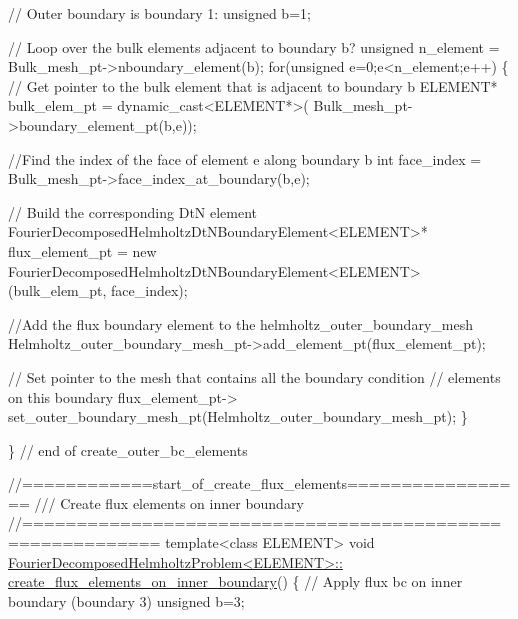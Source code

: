 \begin{DoxyCodeInclude}
{{{{ \textcolor{comment}{// Outer boundary is boundary 1:}
 \textcolor{keywordtype}{unsigned} b=1;

 \textcolor{comment}{// Loop over the bulk elements adjacent to boundary b?}
 \textcolor{keywordtype}{unsigned} n\_element = Bulk\_mesh\_pt->nboundary\_element(b);
 \textcolor{keywordflow}{for}(\textcolor{keywordtype}{unsigned} e=0;e<n\_element;e++)
  \{
   \textcolor{comment}{// Get pointer to the bulk element that is adjacent to boundary b}
   ELEMENT* bulk\_elem\_pt = \textcolor{keyword}{dynamic\_cast<}ELEMENT*\textcolor{keyword}{>}(
    Bulk\_mesh\_pt->boundary\_element\_pt(b,e));
   
   \textcolor{comment}{//Find the index of the face of element e along boundary b }
   \textcolor{keywordtype}{int} face\_index = Bulk\_mesh\_pt->face\_index\_at\_boundary(b,e);
   
   \textcolor{comment}{// Build the corresponding DtN element}
   FourierDecomposedHelmholtzDtNBoundaryElement<ELEMENT>* flux\_element\_pt = \textcolor{keyword}{new} 
    FourierDecomposedHelmholtzDtNBoundaryElement<ELEMENT>(bulk\_elem\_pt,
                                                          face\_index);
   
   \textcolor{comment}{//Add the flux boundary element to the  helmholtz\_outer\_boundary\_mesh}
   Helmholtz\_outer\_boundary\_mesh\_pt->add\_element\_pt(flux\_element\_pt);

   \textcolor{comment}{// Set pointer to the mesh that contains all the boundary condition}
   \textcolor{comment}{// elements on this boundary}
   flux\_element\_pt->
    set\_outer\_boundary\_mesh\_pt(Helmholtz\_outer\_boundary\_mesh\_pt);
  \}

\} \textcolor{comment}{// end of create\_outer\_bc\_elements}



\textcolor{comment}{//============start\_of\_create\_flux\_elements=================}\textcolor{comment}{}
\textcolor{comment}{/// Create flux elements on inner boundary}
\textcolor{comment}{}\textcolor{comment}{//==========================================================}
\textcolor{keyword}{template}<\textcolor{keyword}{class} ELEMENT>
\textcolor{keywordtype}{void}  \hyperlink{classFourierDecomposedHelmholtzProblem_a81d64611f2de2492cec6b0621d8124b0}{FourierDecomposedHelmholtzProblem<ELEMENT>::}
\hyperlink{classFourierDecomposedHelmholtzProblem_a81d64611f2de2492cec6b0621d8124b0}{create\_flux\_elements\_on\_inner\_boundary}()
\{
 \textcolor{comment}{// Apply flux bc on inner boundary (boundary 3)}
 \textcolor{keywordtype}{unsigned} b=3;

}}}}
\end{DoxyCodeInclude}
